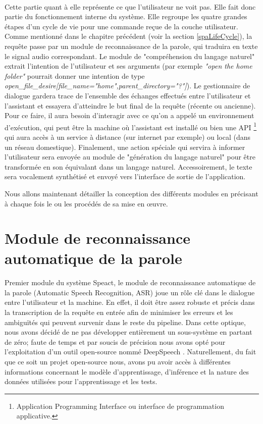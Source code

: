 	\paragraph{}
	\label{system_layer}
	Cette partie quant à elle représente ce que l'utilisateur ne voit pas. Elle fait donc partie du fonctionnement interne du système. Elle regroupe les quatre grandes étapes d'un cycle de vie pour une commande reçue de la couche utilisateur. Comme mentionné dans le chapitre précédent (voir la section \ref{spaLifeCycle}), la requête passe par un module de reconnaissance de la parole, qui traduira en texte le signal audio correspondant. Le module de "compréhension du langage naturel" extrait l'intention de l'utilisateur et ses arguments (par exemple \textit{"open the home folder"} pourrait donner  une intention de type  \textit{open\_file\_desire[file\_name="home",parent\_directory="?"]}). Le gestionnaire de dialogue gardera trace de l'ensemble des échanges effectués entre l'utilisateur et l'assistant et essayera d'atteindre le but final de la requête (récente ou ancienne). Pour ce faire, il aura besoin d'interagir avec ce qu'on a appelé un environnement d'exécution, qui peut être la machine où l'assistant est installé ou bien une API \footnote{Application Programming Interface ou interface de programmation applicative.} qui aura accès à un service à distance (sur internet par exemple) ou local (dans un réseau domestique). Finalement, une action spéciale qui servira à informer l'utilisateur sera envoyée au module de "génération du langage naturel" pour être transformée en son équivalant dans un langage naturel. Accessoirement, le texte sera vocalement synthétisé et envoyé vers l'interface de sortie de l'application.

	\par
	Nous allons maintenant détailler la conception des différents modules en précisant à chaque fois le ou les procédés de sa mise en \oe{}uvre. 
\section{Module de reconnaissance automatique de la parole}
\paragraph{}
\label{asr_probs}
Premier module du système Speact, le module de reconnaissance automatique de la parole (Automatic Speech Recognition, ASR) joue un rôle clé dans le dialogue entre l'utilisateur et la machine. En effet, il doit être assez robuste et précis dans la transcription de la requête en entrée afin de minimiser les erreurs et les ambiguïtés qui peuvent survenir dans le reste du pipeline. Dans cette optique, nous avons décidé de ne pas développer entièrement un sous-système en partant de zéro; faute de temps et par soucis de précision nous avons opté pour l'exploitation d'un outil open-source nommé DeepSpeech \citep{deepspeech_paper}. Naturellement, du fait que ce soit un projet open-source nous, avons pu avoir accès à différentes informations concernant le modèle d'apprentissage, d'inférence et la nature des données utilisées pour l'apprentissage et les tests.
